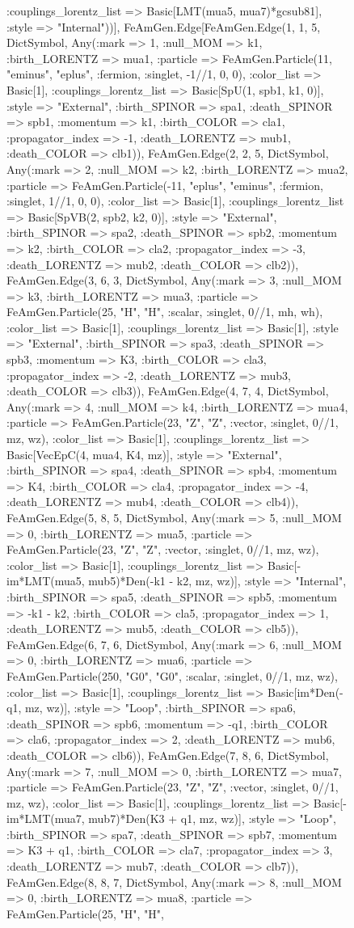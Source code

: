 \documentclass{revtex4}
\begin{document}
\begin{figure}[!htb]
\begin{center}
{:couplings_lorentz_list => Basic[LMT(mua5, mua7)*gcsub81], :style => "Internal"))], FeAmGen.Edge[FeAmGen.Edge(1, 1, 5, Dict{Symbol, Any}(:mark => 1, :null_MOM => k1, :birth_LORENTZ => mua1, :particle => FeAmGen.Particle(11, "eminus", "eplus", :fermion, :singlet, -1//1, 0, 0), :color_list => Basic[1], :couplings_lorentz_list => Basic[SpU(1, spb1, k1, 0)], :style => "External", :birth_SPINOR => spa1, :death_SPINOR => spb1, :momentum => k1, :birth_COLOR => cla1, :propagator_index => -1, :death_LORENTZ => mub1, :death_COLOR => clb1)), FeAmGen.Edge(2, 2, 5, Dict{Symbol, Any}(:mark => 2, :null_MOM => k2, :birth_LORENTZ => mua2, :particle => FeAmGen.Particle(-11, "eplus", "eminus", :fermion, :singlet, 1//1, 0, 0), :color_list => Basic[1], :couplings_lorentz_list => Basic[SpVB(2, spb2, k2, 0)], :style => "External", :birth_SPINOR => spa2, :death_SPINOR => spb2, :momentum => k2, :birth_COLOR => cla2, :propagator_index => -3, :death_LORENTZ => mub2, :death_COLOR => clb2)), FeAmGen.Edge(3, 6, 3, Dict{Symbol, Any}(:mark => 3, :null_MOM => k3, :birth_LORENTZ => mua3, :particle => FeAmGen.Particle(25, "H", "H", :scalar, :singlet, 0//1, mh, wh), :color_list => Basic[1], :couplings_lorentz_list => Basic[1], :style => "External", :birth_SPINOR => spa3, :death_SPINOR => spb3, :momentum => K3, :birth_COLOR => cla3, :propagator_index => -2, :death_LORENTZ => mub3, :death_COLOR => clb3)), FeAmGen.Edge(4, 7, 4, Dict{Symbol, Any}(:mark => 4, :null_MOM => k4, :birth_LORENTZ => mua4, :particle => FeAmGen.Particle(23, "Z", "Z", :vector, :singlet, 0//1, mz, wz), :color_list => Basic[1], :couplings_lorentz_list => Basic[VecEpC(4, mua4, K4, mz)], :style => "External", :birth_SPINOR => spa4, :death_SPINOR => spb4, :momentum => K4, :birth_COLOR => cla4, :propagator_index => -4, :death_LORENTZ => mub4, :death_COLOR => clb4)), FeAmGen.Edge(5, 8, 5, Dict{Symbol, Any}(:mark => 5, :null_MOM => 0, :birth_LORENTZ => mua5, :particle => FeAmGen.Particle(23, "Z", "Z", :vector, :singlet, 0//1, mz, wz), :color_list => Basic[1], :couplings_lorentz_list => Basic[-im*LMT(mua5, mub5)*Den(-k1 - k2, mz, wz)], :style => "Internal", :birth_SPINOR => spa5, :death_SPINOR => spb5, :momentum => -k1 - k2, :birth_COLOR => cla5, :propagator_index => 1, :death_LORENTZ => mub5, :death_COLOR => clb5)), FeAmGen.Edge(6, 7, 6, Dict{Symbol, Any}(:mark => 6, :null_MOM => 0, :birth_LORENTZ => mua6, :particle => FeAmGen.Particle(250, "G0", "G0", :scalar, :singlet, 0//1, mz, wz), :color_list => Basic[1], :couplings_lorentz_list => Basic[im*Den(-q1, mz, wz)], :style => "Loop", :birth_SPINOR => spa6, :death_SPINOR => spb6, :momentum => -q1, :birth_COLOR => cla6, :propagator_index => 2, :death_LORENTZ => mub6, :death_COLOR => clb6)), FeAmGen.Edge(7, 8, 6, Dict{Symbol, Any}(:mark => 7, :null_MOM => 0, :birth_LORENTZ => mua7, :particle => FeAmGen.Particle(23, "Z", "Z", :vector, :singlet, 0//1, mz, wz), :color_list => Basic[1], :couplings_lorentz_list => Basic[-im*LMT(mua7, mub7)*Den(K3 + q1, mz, wz)], :style => "Loop", :birth_SPINOR => spa7, :death_SPINOR => spb7, :momentum => K3 + q1, :birth_COLOR => cla7, :propagator_index => 3, :death_LORENTZ => mub7, :death_COLOR => clb7)), FeAmGen.Edge(8, 8, 7, Dict{Symbol, Any}(:mark => 8, :null_MOM => 0, :birth_LORENTZ => mua8, :particle => FeAmGen.Particle(25, "H", "H", }
\end{center}
\end{figure}
\end{document}
